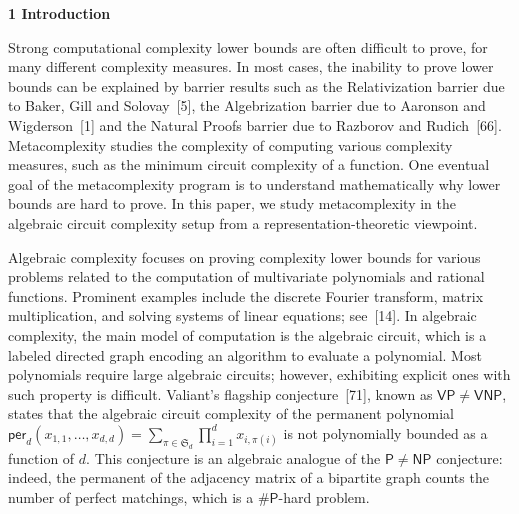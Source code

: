 \documentclass[10pt,a4paper]{article}
\begin{document}
\par\medskip\noindent\textbf{1 Introduction}\par




Strong computational complexity lower bounds are often difficult to prove, for many different complexity measures. In most cases, the inability to prove lower bounds can be explained by barrier results such as the Relativization barrier due to Baker, Gill and Solovay [5], the Algebrization barrier due to Aaronson and Wigderson [1] and the Natural Proofs barrier due to Razborov and Rudich [66]. Metacomplexity studies the complexity of computing various complexity measures, such as the minimum circuit complexity of a function.
One eventual goal of the metacomplexity program is to understand mathematically why lower bounds are hard to prove.
In this paper, we study metacomplexity in the algebraic circuit complexity setup from a representation-theoretic viewpoint.





Algebraic complexity focuses on proving complexity lower bounds for various problems related to the computation of multivariate polynomials and rational functions. Prominent examples include the discrete Fourier transform, matrix multiplication, and solving systems of linear equations; see [14].
In algebraic complexity, the main model of computation is the algebraic circuit, which is a labeled directed graph encoding an algorithm to evaluate a polynomial. Most polynomials require large algebraic circuits; however, exhibiting explicit ones with such property is difficult. Valiant’s flagship conjecture [71], known as $\mathsf{VP}\neq\mathsf{VNP}$, states that the algebraic circuit complexity of the permanent polynomial $\mathsf{per}_{d}(x_{1,1},\dots,x_{d,d})=\sum_{\pi\in\mathfrak{S}_{d}}\prod_{i=1}^{d}x_{i,\pi(i)}$ is not polynomially bounded as a function of $d$. This conjecture is an algebraic analogue of the $\mathsf{P}\neq\mathsf{NP}$ conjecture: indeed, the permanent of the adjacency matrix of a bipartite graph counts the number of perfect matchings, which is a $\#\mathsf{P}$-hard problem.
\end{document}
